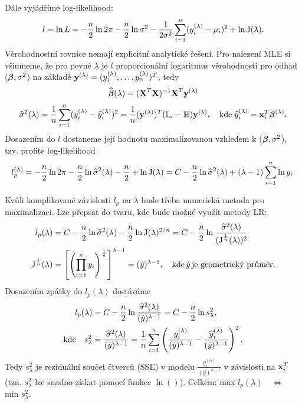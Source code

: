 Dále vyjádříme log-likelihood:
$$
 l = \ln L = -\frac{n}{2}\ln 2 \pi - \frac{n}{2}\ln \sigma^2 - \frac{1}{2 \sigma^2} \sum\limits_{i=1}^{n} ( y_i^{(\lambda)} - \mu_i )^2 + \ln\text{J}(\lambda).
$$
Věrohodnostní rovnice nemají explicitní analytické řešení. Pro nalezení MLE si všimneme, že pro pevné $ \lambda $ je $ l $ proporcionální logaritmus věrohodnosti pro odhad ($ \boldsymbol{\beta} , \sigma^2 $) na základě $ \textbf{y}^{(\lambda)} = ( y_1^{(\lambda)}, \dots , y_n^{(\lambda)})^T $, tedy
$$
 \widehat{\boldsymbol{\beta}} (\lambda ) = {(\textbf{X}^T\textbf{X})^{-1}} \textbf{X}^T \textbf{y}^{(\lambda)}
$$
$$
 \widehat{\sigma}^2 (\lambda ) = \frac{1}{n} \sum\limits_{i=1}^{n} ( y_i^{(\lambda)} - \widehat{y} _i^{(\lambda)} )^2 = \frac{1}{n} (\textbf{y}^{(\lambda)})^T ( \mathbb{I} _n - \mathbb{H} ) \textbf{y}^{(\lambda)} , \quad \text{kde} \; \widehat{y}_i^{(\lambda)} = \textbf{x}_i^T \boldsymbol{\beta}^{(\lambda)}.
$$
Dosazením do $ l $ dostaneme její hodnotu maximalizovanou vzhledem k ($ \boldsymbol{\beta} , \sigma^2 $), tzv. profite log-likelihood
$$
  l_p^{(\lambda)} = -\frac{n}{2} \ln 2 \pi - \frac{n}{2} \ln \widehat{\sigma}^2 ( \lambda ) - \frac{n}{2} + \ln \text{J}(\lambda) 
  = C - \frac{n}{2} \ln \widehat{\sigma}^2 ( \lambda ) + ( \lambda - 1 )  \sum\limits_{i=1}^{n} \ln y_i.
$$
\begin{remark}
Kvůli komplikované závislosti $ l_p $ na $ \lambda $ bude třeba numerická metoda pro maximalizaci. Lze přepsat do tvaru, kde bude možné využít metody LR:
\begin{align*}
 l_p (\lambda) & =  C - \frac{n}{2} \ln \widehat{\sigma}^2 ( \lambda )  - \frac{n}{2} \ln\text{J}(\lambda)^{2/n} = C - \frac{n}{2} \ln \frac{ \widehat{\sigma}^2 ( \lambda )}{(\text{J}^{\frac{1}{n}}(\lambda))^2} \\
 \text{J}^{\frac{1}{n}}(\lambda) & = \left[ \left( \prod_{i=1}^{n} y_i \right)^{\frac{1}{n}} \right]^{\lambda - 1} = ( \dot{y} )^{\lambda - 1}, \quad \text{kde} \, \dot{y} \, \text{je geometrický průměr.}
\end{align*}
Dosazením zpátky do $l_p(\lambda)$ dostáváme
\begin{align*}
\quad  l_p(\lambda) & = C - \frac{n}{2} \ln \frac{ \widehat{\sigma}^2 ( \lambda )}{(\dot{y})^{\lambda - 1}} = C - \frac{n}{2}\ln s_{\lambda}^{2}, \\
\text{kde} \quad s_{\lambda}^{2} & = \frac{ \widehat{\sigma}^2 ( \lambda )}{(\dot{y})^{\lambda - 1}} = \frac{1}{n} \sum\limits_{i=1}^{n} \left( \frac{y_i^{(\lambda)}}{( \dot{y})^{\lambda-1}} - \frac{\widehat{y}_i^{(\lambda)}}{( \dot{y})^{\lambda-1}} \right)^2.
\end{align*}
Tedy $ s_{\lambda}^{2} $ je reziduální součet čtverců (SSE) v modelu $ \frac{y_i^{(\lambda)}}{( \dot{y})^{\lambda-1}} $ v závislosti na $ \textbf{x}_i^T $ (tzn. $ s_{\lambda}^{2} $ lze snadno získat pomocí funkce $\ln()$). Celkem: max $ l_p(\lambda) \quad \Leftrightarrow \quad $ min $ s_{\lambda}^{2} $.
\end{remark}

